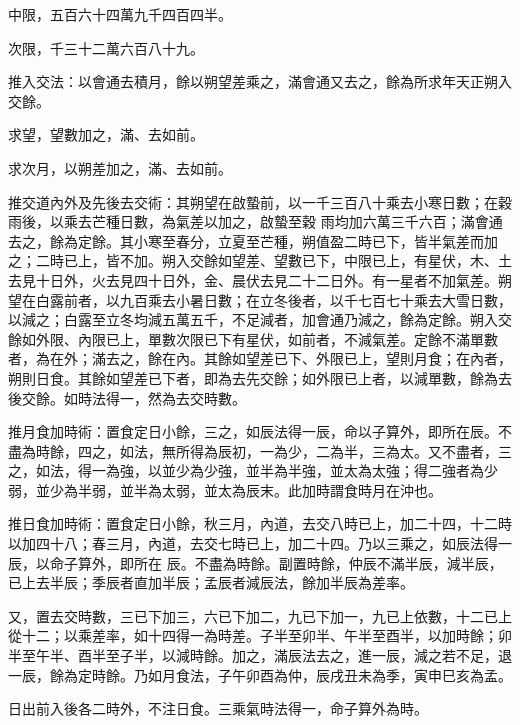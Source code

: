\begin{pinyinscope}
 中限，五百六十四萬九千四百四半。



 次限，千三十二萬六百八十九。



 推入交法：以會通去積月，餘以朔望差乘之，滿會通又去之，餘為所求年天正朔入交餘。



 求望，望數加之，滿、去如前。



 求次月，以朔差加之，滿、去如前。



 推交道內外及先後去交術：其朔望在啟蟄前，以一千三百八十乘去小寒日數；在穀雨後，以乘去芒種日數，為氣差以加之，啟蟄至穀
 雨均加六萬三千六百；滿會通去之，餘為定餘。其小寒至春分，立夏至芒種，朔值盈二時已下，皆半氣差而加之；二時已上，皆不加。朔入交餘如望差、望數已下，中限已上，有星伏，木、土去見十日外，火去見四十日外，金、晨伏去見二十二日外。有一星者不加氣差。朔望在白露前者，以九百乘去小暑日數；在立冬後者，以千七百七十乘去大雪日數，以減之；白露至立冬均減五萬五千，不足減者，加會通乃減之，餘為定餘。朔入交餘如外限、內限已上，單數次限已下有星伏，如前者，不減氣差。定餘不滿單數者，為在外；滿去之，餘在內。其餘如望差已下、外限已上，望則月食；在內者，朔則日食。其餘如望差已下者，即為去先交餘；如外限已上者，以減單數，餘為去後交餘。如時法得一，然為去交時數。



 推月食加時術：置食定日小餘，三之，如辰法得一辰，命以子算外，即所在辰。不盡為時餘，四之，如法，無所得為辰初，一為少，二為半，三為太。又不盡者，三之，如法，得一為強，以並少為少強，並半為半強，並太為太強；得二強者為少弱，並少為半弱，並半為太弱，並太為辰末。此加時謂食時月在沖也。



 推日食加時術：置食定日小餘，秋三月，內道，去交八時已上，加二十四，十二時以加四十八；春三月，內道，去交七時已上，加二十四。乃以三乘之，如辰法得一辰，以命子算外，即所在
 辰。不盡為時餘。副置時餘，仲辰不滿半辰，減半辰，已上去半辰；季辰者直加半辰；孟辰者減辰法，餘加半辰為差率。



 又，置去交時數，三已下加三，六已下加二，九已下加一，九已上依數，十二已上從十二；以乘差率，如十四得一為時差。子半至卯半、午半至酉半，以加時餘；卯半至午半、酉半至子半，以減時餘。加之，滿辰法去之，進一辰，減之若不足，退一辰，餘為定時餘。乃如月食法，子午卯酉為仲，辰戌丑未為季，寅申巳亥為孟。



 日出前入後各二時外，不注日食。三乘氣時法得一，命子算外為時。




\end{pinyinscope}
